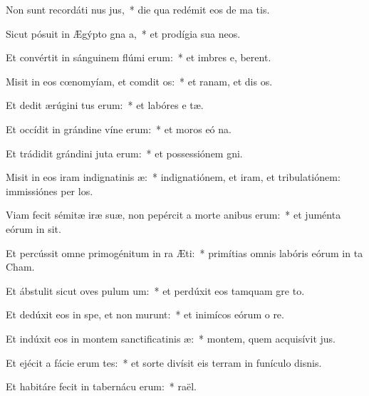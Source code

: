 \item Non sunt recordáti nus jus,~* die qua redémit eos de ma tis.
\item Sicut pósuit in Ægýpto gna a,~* et prodígia sua   neos.
\item Et convértit in sánguinem flúmi erum:~* et imbres e,  berent.
\item Misit in eos cœnomyíam, et comdit os:~* et ranam, et dis os.
\item Et dedit ærúgini tus erum:~* et labóres e tæ.
\item Et occídit in grándine víne erum:~* et moros eó  na.
\item Et trádidit grándini juta erum:~* et possessiónem  gni.
\item Misit in eos iram indignatinis æ:~* indignatiónem, et iram, et tribulatiónem: immissiónes per  los.
\item Viam fecit sémitæ iræ suæ, non pepércit a morte anibus erum:~* et juménta eórum in  sit.
\item Et percússit omne primogénitum in ra Æti:~* primítias omnis labóris eórum in ta Cham.
\item Et ábstulit sicut oves pulum um:~* et perdúxit eos tamquam gre  to.
\item Et dedúxit eos in spe, et non murunt:~* et inimícos eórum o re.
\item Et indúxit eos in montem sanctificatinis æ:~* montem, quem acquisívit  jus.
\item Et ejécit a fácie erum tes:~* et sorte divísit eis terram in funículo disnis.
\item Et habitáre fecit in tabernácu erum:~*  raël.
